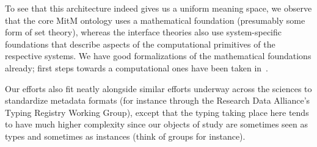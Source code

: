 To see that this architecture indeed gives us a uniform meaning space, we observe that the
core MitM ontology uses a mathematical foundation (presumably some form of set theory),
whereas the interface theories also use system-specific foundations that describe aspects
of the computational primitives of the respective systems. We have good formalizations of
the mathematical foundations already; first steps towards a computational ones have been
taken in~\cite{KohManRab:aumftg13}.

Our efforts also fit neatly alongside similar efforts underway across the sciences to
standardize metadata formats (for instance through the Research Data Alliance's Typing
Registry Working Group\cite{rda-typing}), except that the typing taking place here tends
to have much higher complexity since our objects of study are sometimes seen as types and
sometimes as instances (think of groups for instance). 


